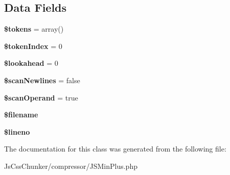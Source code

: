 \subsection*{Data Fields}
\begin{DoxyCompactItemize}
\item 
\hypertarget{class_j_s_tokenizer_a72ead29e4317fbc4335fd3ba764e8b59}{
{\bfseries \$tokens} = array()}
\label{class_j_s_tokenizer_a72ead29e4317fbc4335fd3ba764e8b59}

\item 
\hypertarget{class_j_s_tokenizer_ad090aa27f0cb9c4cff522d7e5393a840}{
{\bfseries \$tokenIndex} = 0}
\label{class_j_s_tokenizer_ad090aa27f0cb9c4cff522d7e5393a840}

\item 
\hypertarget{class_j_s_tokenizer_ac7a2f8ba99c504f2ec1beca2114a5980}{
{\bfseries \$lookahead} = 0}
\label{class_j_s_tokenizer_ac7a2f8ba99c504f2ec1beca2114a5980}

\item 
\hypertarget{class_j_s_tokenizer_a2916e388b60227afb49dfd382a65b59f}{
{\bfseries \$scanNewlines} = false}
\label{class_j_s_tokenizer_a2916e388b60227afb49dfd382a65b59f}

\item 
\hypertarget{class_j_s_tokenizer_a973aa3e8c033cfd54e56de9cf0ceab2e}{
{\bfseries \$scanOperand} = true}
\label{class_j_s_tokenizer_a973aa3e8c033cfd54e56de9cf0ceab2e}

\item 
\hypertarget{class_j_s_tokenizer_a0722441477f957078ee2437054556cbc}{
{\bfseries \$filename}}
\label{class_j_s_tokenizer_a0722441477f957078ee2437054556cbc}

\item 
\hypertarget{class_j_s_tokenizer_a865384ce49abf1c78f8aea48c7b5aa48}{
{\bfseries \$lineno}}
\label{class_j_s_tokenizer_a865384ce49abf1c78f8aea48c7b5aa48}

\end{DoxyCompactItemize}


The documentation for this class was generated from the following file:\begin{DoxyCompactItemize}
\item 
JsCssChunker/compressor/JSMinPlus.php\end{DoxyCompactItemize}
